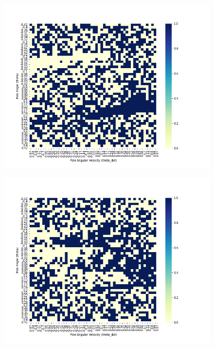 \documentclass{article}
\begin{document}
    \begin{figure}[H]
        \graphicspath{ {../experiments/CartPole/} }
        \centering
        \begin{minipage}{.33\textwidth}
        \nonumber
          \centering
          \includegraphics[width=\linewidth]{CartPole_montecarlo_policy.png}
          \label{fig:test1}
        \end{minipage}%
        \begin{minipage}{.33\textwidth}
        \nonumber
          \centering
          \includegraphics[width=\linewidth]{CartPole_sarsa_policy.png}

\end{minipage}
\end{figure}
\end{document}
